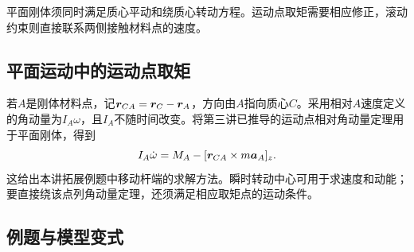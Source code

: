 平面刚体须同时满足质心平动和绕质心转动方程。运动点取矩需要相应修正，滚动约束则直接联系两侧接触材料点的速度。



\subsection{平面运动中的运动点取矩}
若$A$是刚体材料点，记$\bm{r}_{CA}=\bm{r}_C-\bm{r}_A$，方向由$A$指向质心$C$。采用相对$A$速度定义的角动量为$I_A\omega$，且$I_A$不随时间改变。将第三讲已推导的运动点相对角动量定理用于平面刚体，得到
\[
 \label{sup6:eq:d5-material-origin} I_A\dot\omega=M_A-[\bm{r}_{CA}\times m\bm{a}_A]_z.
\]
这给出本讲拓展例题中移动杆端的求解方法。瞬时转动中心可用于求速度和动能；要直接绕该点列角动量定理，还须满足相应取矩点的运动条件。





\subsection{例题与模型变式}

